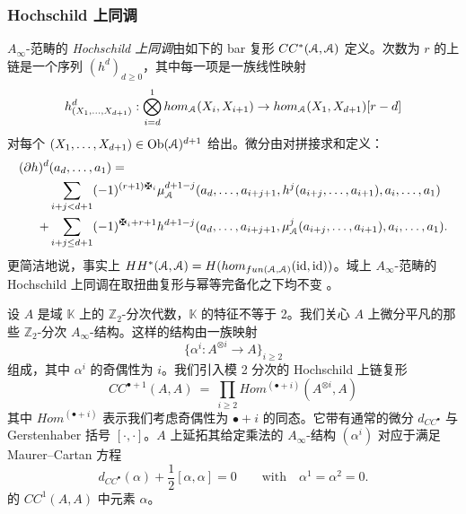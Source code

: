 \documentclass[11pt,a4paper]{article}
\numberwithin{equation}{section}
\newcommand{\bZ}{\mathbb{Z}}
\newcommand{\bK}{\mathbb{K}}
\newcommand{\scrA}{\EuScript{A}}
\newcommand{\id}{\mathrm{id}}
\newcommand{\Ob}{\mathrm{Ob}}
\begin{document}
\subsubsection{Hochschild 上同调}

$A_{\infty}$-范畴的 \emph{Hochschild 上同调}由如下的 bar 复形 $CC^*(\scrA,\scrA)$ 定义。次数为 $r$ 的上链是一个序列 $(h^d)_{d\geq 0}$，其中每一项是一族线性映射
\[
h^d_{(X_1,\ldots,X_{d+1})}: \bigotimes_{i=d}^1 hom_{\scrA}(X_i,X_{i+1}) \rightarrow hom_{\scrA}(X_1,X_{d+1})[r-d]
\]
对每个 $(X_1,\ldots,X_{d+1})\in \Ob(\scrA)^{d+1}$ 给出。微分由对拼接求和定义：
\begin{equation} \label{Eqn:Hochschild}
\begin{aligned}
(\partial h)^d & (a_d,\ldots, a_1) = \\
& \sum_{i+j<d+1} (-1)^{(r+1)\maltese_i} \mu_{\scrA}^{d+1-j}(a_d,\ldots,a_{i+j+1},h^j(a_{i+j},\ldots,a_{i+1}),a_{i},\ldots,a_1) \\
+ &  \sum_{i+j\leq d+1} (-1)^{\maltese_{i} +r +1}  h^{d+1-j} (a_d,\ldots,a_{i+j+1},\mu_{\scrA}^j(a_{i+j},\ldots,a_{i+1}),a_{i},\ldots,a_1).
\end{aligned}
\end{equation}
更简洁地说，事实上 $HH^*(\scrA,\scrA) = H(hom_{fun(\scrA,\scrA)}(\id,\id))$。域上 $A_{\infty}$-范畴的 Hochschild 上同调在取扭曲复形与幂等完备化之下均不变 \cite[Section 1c]{Seidel:Flux}。

设 $A$ 是域 $\bK$ 上的 $\bZ_2$-分次代数，$\bK$ 的特征不等于 2。我们关心 $A$ 上微分平凡的那些 $\bZ_2$-分次 $A_{\infty}$-结构。这样的结构由一族映射
\[
\{ \alpha^i: A^{\otimes i} \rightarrow A \}_{i\geq 2}
\]
组成，其中 $\alpha^i$ 的奇偶性为 $i$。我们引入模 2 分次的 Hochschild 上链复形
\[
CC^{\bullet+1}(A,A) \ = \ \prod_{i \geq 2} Hom^{(\bullet+i)}(A^{\otimes i},A)
\]
其中 $Hom^{(\bullet +i)}$ 表示我们考虑奇偶性为 $\bullet+i$ 的同态。它带有通常的微分 $d_{CC^{\bullet}}$ 与 Gerstenhaber 括号 $[\cdot, \cdot]$。$A$ 上延拓其给定乘法的 $A_{\infty}$-结构 $(\alpha^i)$ 对应于满足 Maurer--Cartan 方程
\begin{equation} \label{Eqn:Maurer-Cartan}
d_{CC^{\bullet}} (\alpha) + \frac{1}{2} [\alpha, \alpha] = 0\qquad \textrm{with} \quad \alpha^1 = \alpha^2 = 0.
\end{equation}
的 $CC^{1}(A,A)$ 中元素 $\alpha$。
\end{document}
